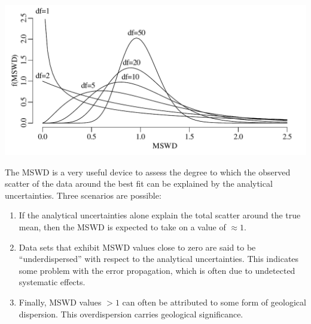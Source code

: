 \begin{refsection}
\noindent\begin{minipage}[t]{.7\textwidth}
\strut\vspace*{-\baselineskip}\newline
\includegraphics[width=\textwidth]{../figures/mswd.pdf}
\end{minipage}
\begin{minipage}[t]{.3\textwidth}
  \label{fig:mswd}
\end{minipage}

The MSWD is a very useful device to assess the degree to which the
observed scatter of the data around the best fit can be explained by
the analytical uncertainties. Three scenarios are possible:

\begin{enumerate}
  \item If the analytical uncertainties alone explain the total
    scatter around the true mean, then the MSWD is expected to take on
    a value of $\approx{1}$.
\item Data sets that exhibit MSWD values close to zero are said to be
  ``underdispersed'' with respect to the analytical
  uncertainties. This indicates some problem with the error
  propagation, which is often due to undetected systematic effects.
\item Finally, MSWD values $>1$ can often be attributed to some form
  of geological dispersion. This overdispersion carries geological
  significance.
\end{enumerate}


\end{refsection}
